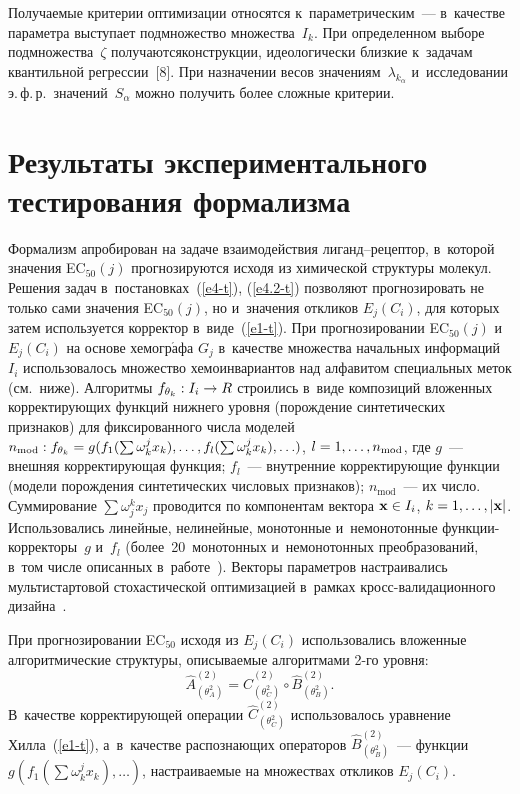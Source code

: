 \begin{multicols}{2}
     Получаемые критерии оптимизации относятся к~параметрическим~--- 
в~качестве параметра выступает подмножество множества~$I_k$. При 
определенном выборе подмножества~$\zeta$ получаются\linebreak \mbox{конструкции}, 
идеологически близкие к~задачам квантильной регрессии~[8]. При назначении 
весов значениям~$\lambda_{k_\alpha}$ и~исследовании э.\,ф.\,р.\ 
значений~$S_\alpha$ можно получить более сложные критерии.
     
\section{Результаты экспериментального тестирования формализма}

    Формализм апробирован на задаче взаимодействия лиганд--рецептор, 
    в~которой значения EC$_{50}(j)$ прогнозируются исходя из химической 
структуры молекул.  Решения задач в~постановках~(\ref{e4-t}), (\ref{e4.2-t}) 
позволяют прогнозировать не только сами значения EC$_{50}(j)$, но 
и~значения откликов $E_j(C_i)$, для которых затем используется корректор 
в~виде~(\ref{e1-t}). При прогнозировании EC$_{50} (j)$ и~$E_j(C_i)$ на основе 
хемогр$\acute{\mbox{а}}$фа $G_j$ в~качестве множества начальных 
информаций~$I_i$ использовалось множество хемоинвариантов над алфавитом 
специальных меток (см.\ ниже). Алгоритмы $f_{\theta_k}: I_i\hm\to R$ 
строились в~виде композиций вложенных корректирующих функций нижнего 
уровня (порождение синтетических признаков) для фиксированного числа 
моделей $n_{\mathrm{mod}} : f_{\theta_k}\hm= g(f_1(\sum \omega_k^j x_k), \ldots , f_l(\sum 
\omega_k^j x_k),\ldots )$, $l\hm=1,\ldots,n_{\mathrm{mod}}$, где $g$~--- внешняя 
корректирующая функция; $f_l$~--- внутренние корректирующие функции 
(модели порождения синтетических числовых признаков); $n_{\mathrm{mod}}$~--- их 
число. Суммирование $\sum\omega_j^k x_j$ проводится по компонентам 
вектора $\mathbf{x}\hm\in I_i$,\linebreak
 $k\hm=1,\ldots,\vert \mathbf{x}\vert$. 
Использовались линейные, нелинейные, монотонные и~немонотонные  
функ\-ции-кор\-рек\-то\-ры~$g$ и~$f_l$ (более~20~монотонных 
и~немонотонных преобразований, в~том числе \mbox{описанных} в~\mbox{работе}~\cite{6-t}). 
Векторы параметров настраивались мультистартовой стохастической 
оптимизацией в~рамках кросс-ва\-ли\-да\-ци\-он\-но\-го дизайна~\cite{6-t}.

     При прогнозировании EC$_{50}$ исходя из $E_j(C_i)$ использовались 
вложенные алгоритмические структуры, описываемые алгоритмами 2-го 
уровня: 
$$
\hat{{A}}^{(2)}_{(\theta^2_A)} =
     \hat{{C}}^{(2)}_{(\theta^2_C)}\circ
     \hat{{B}}^{(2)}_{(\theta^2_B)}.
     $$
      В~качестве корректирующей 
операции $\hat{{C}}^{(2)}_{(\theta^2_C)}$ использовалось уравнение 
Хилла~(\ref{e1-t}), а~в~качестве распознающих операторов 
$\hat{{B}}^{(2)}_{(\theta^2_B)}$~--- функции $g(f_1(\sum \omega_k^j x_k),\ldots)$, настраиваемые на множествах откликов $E_j(C_i)$.


\end{multicols}
